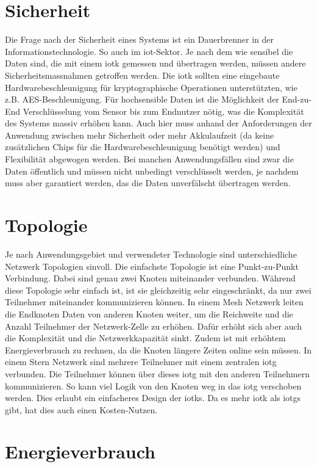 \section{Sicherheit}

Die Frage nach der Sicherheit eines Systems ist ein Dauerbrenner in der Informationstechnologie. So auch im \acrshort{iot}-Sektor. Je nach dem wie sensibel die Daten sind, die mit einem \gls{iotk} gemessen und übertragen werden, müssen andere Sicherheitsmassnahmen getroffen werden. Die \gls{iotk} sollten eine eingebaute Hardwarebeschleunigung für kryptographische Operationen unterstützten, wie z.B. AES-Beschleunigung. Für hochsensible Daten ist die Möglichkeit der End-zu-End Verschlüsselung vom Sensor bis zum Endnutzer nötig, was die Komplexität des Systems massiv erhöhen kann. Auch hier muss anhand der Anforderungen der Anwendung zwischen mehr Sicherheit oder mehr Akkulaufzeit (da keine zusätzlichen Chips für die Hardwarebeschleunigung benötigt werden) und Flexibilität abgewogen werden. Bei manchen Anwendungsfällen sind zwar die Daten öffentlich und müssen nicht unbedingt verschlüsselt werden, je nachdem muss aber garantiert werden, das die Daten unverfälscht übertragen werden.

\section{Topologie}

Je nach Anwendungsgebiet und verwendeter Technologie sind unterschiedliche Netzwerk Topologien sinvoll. Die einfachste Topologie ist eine Punkt-zu-Punkt Verbindung. Dabei sind genau zwei Knoten miteinander verbunden. Während diese Topologie sehr einfach ist, ist sie gleichzeitig sehr eingeschränkt, da nur zwei Teilnehmer miteinander kommunizieren können. In einem Mesh Netzwerk leiten die Endknoten Daten von anderen Knoten weiter, um die Reichweite und die Anzahl Teilnehmer der Netzwerk-Zelle zu erhöhen. Dafür erhöht sich aber auch die Komplexität und die Netzwerkkapazität sinkt. Zudem ist mit erhöhtem Energieverbrauch zu rechnen, da die Knoten längere Zeiten online sein müssen. In einem Stern Netzwerk sind mehrere Teilnehmer mit einem zentralen \gls{iotg} verbunden. Die Teilnehmer können über dieses \gls{iotg} mit den anderen Teilnehmern kommunizieren. So kann viel Logik von den Knoten weg in das \gls{iotg} verschoben werden. Dies erlaubt ein einfacheres Design der \glspl{iotk}. Da es mehr \gls{iotk} als \glspl{iotg} gibt, hat dies auch einen Kosten-Nutzen.

\section{Energieverbrauch}

